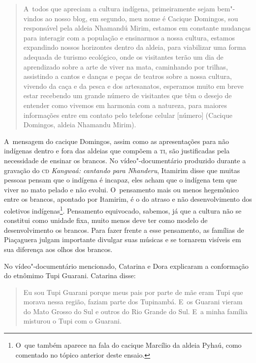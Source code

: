 \begin{quote}
\noindent
A~todos que apreciam a cultura indígena, primeiramente sejam bem"-vindos ao
nosso blog, em segundo, meu nome é Cacique Domingos, sou responsável
pela aldeia Nhamandú Mirim, estamos em constante mudanças para
interagir com a população e ensinarmos a nossa cultura, estamos
expandindo nossos horizontes dentro da aldeia, para viabilizar uma
forma adequada de turismo ecológico, onde os visitantes terão um dia de
aprendizado sobre a arte de viver na mata, caminhando por trilhas,
assistindo a cantos e danças e peças de teatros sobre a nossa cultura,
vivendo da caça e da pesca e dos artesanatos, esperamos muito em breve
estar recebendo um grande número de visitantes que têm o desejo de
entender como vivemos em harmonia com a natureza, para maiores
informações entre em contato pelo telefone celular [número] (Cacique
Domingos, aldeia Nhamandu Mirim).
\end{quote}

A~mensagem do cacique Domingos, assim como as apresentações para não
indígenas dentro e fora das aldeias que compõem a \textsc{ti}, são justificadas
pela necessidade de ensinar os brancos. No vídeo"-documentário produzido
durante a gravação do \textsc{cd} \emph{Kangwaá: cantando para Nhanderu}, Itamirim
disse que muitas pessoas pensam que o indígena é incapaz, eles acham
que o indígena tem que viver no mato pelado e não evolui. O~pensamento
mais ou menos hegemônico entre os brancos, apontado por Itamirim, é o
do atraso e não desenvolvimento dos coletivos indígenas\footnote{O~que
também aparece na fala do cacique Marcílio da aldeia Pyhaú, como
comentado no tópico anterior deste ensaio.}. Pensamento equivocado,
sabemos, já que a cultura não se constitui como unidade fixa, muito
menos deve ter como modelo de desenvolvimento os brancos. Para fazer
frente a esse pensamento, as famílias de Piaçaguera julgam importante
divulgar suas músicas e se tornarem visíveis em sua diferença aos olhos
dos brancos.

No vídeo"-documentário mencionado, Catarina e Dora explicaram a
conformação do etnômimo Tupi Guarani. Catarina disse: 

\begin{quote}
\noindent
Eu sou Tupi Guarani porque meus pais por parte de mãe eram Tupi que
morava nessa região, faziam parte dos Tupinambá. E~os Guarani vieram do
Mato Grosso do Sul e outros do Rio Grande do Sul. E~a minha família
misturou o Tupi com o Guarani.
\end{quote}

